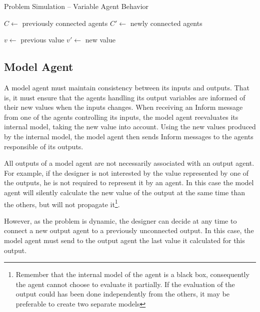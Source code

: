 \begin{algorithm}
\caption{Problem Simulation -- Variable Agent Behavior}
\label{algo_simulating_variable}

	$C \leftarrow$ previously connected agents\;
	$C'\leftarrow$ newly connected agents\;
		
	$v \leftarrow$ previous value\;
	$v'\leftarrow$ new value\;
	
	
	
\end{algorithm}

\subsection{Model Agent}\label{simulation_model}

A model agent must maintain consistency between its inputs and outputs. That is, it must ensure that the agents handling its output variables are informed of their new values when the inputs changes. When receiving an Inform message from one of the agents controlling its inputs, the model agent reevaluates its internal model, taking the new value into account. Using the new values produced by the internal model, the model agent then sends Inform messages to the agents responsible of its outputs.

All outputs of a model agent are not necessarily associated with an output agent. For example, if the designer is not interested by the value represented by one of the outputs, he is not required to represent it by an agent. In this case the model agent will silently calculate the new value of the output at the same time than the others, but will not propagate it\footnote{Remember that the internal model of the agent is a black box, consequently the agent cannot choose to evaluate it partially. If the evaluation of the output could has been done independently from the others, it may be preferable to create two separate models}.

However, as the problem is dynamic, the designer can decide at any time to connect a new output agent to a previously unconnected output. In this case, the model agent must send to the output agent the last value it calculated for this output.


